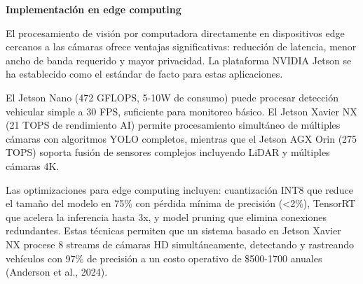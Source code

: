 \documentclass[12pt,a4paper,oneside]{report}
\begin{document}
\textbf{Implementación en edge computing}

El procesamiento de visión por computadora directamente en dispositivos edge cercanos a las cámaras ofrece ventajas significativas: reducción de latencia, menor ancho de banda requerido y mayor privacidad. La plataforma NVIDIA Jetson se ha establecido como el estándar de facto para estas aplicaciones.

El Jetson Nano (472 GFLOPS, 5-10W de consumo) puede procesar detección vehicular simple a 30 FPS, suficiente para monitoreo básico. El Jetson Xavier NX (21 TOPS de rendimiento AI) permite procesamiento simultáneo de múltiples cámaras con algoritmos YOLO completos, mientras que el Jetson AGX Orin (275 TOPS) soporta fusión de sensores complejos incluyendo LiDAR y múltiples cámaras 4K.

Las optimizaciones para edge computing incluyen: cuantización INT8 que reduce el tamaño del modelo en 75\% con pérdida mínima de precisión (\textless2\%), TensorRT que acelera la inferencia hasta 3x, y model pruning que elimina conexiones redundantes. Estas técnicas permiten que un sistema basado en Jetson Xavier NX procese 8 streams de cámaras HD simultáneamente, detectando y rastreando vehículos con 97\% de precisión a un costo operativo de \$500-1700 anuales (Anderson et al., 2024).

\label{tbl:2.4}
\end{document}
